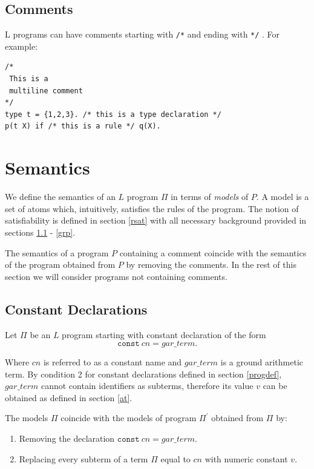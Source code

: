 \documentclass[a4paper,10pt]{article}
\begin{document}
\subsection{Comments}

L programs can have comments starting with \texttt{/*} and ending with \texttt{*/} . For example:

\begin{verbatim}
/*
 This is a
 multiline comment
*/
type t = {1,2,3}. /* this is a type declaration */
p(t X) if /* this is a rule */ q(X). 
\end{verbatim}


\section{Semantics}
We define the semantics of an $L$ program $\Pi$ in terms of \textit{models} of $P$. A model is a set of atoms which, intuitively, satisfies the rules of the program. The notion of satisfiability is defined in section \ref{rsat} with all necessary background provided in sections 
\ref{constants} - \ref{grp}.

The semantics of a program $P$ containing a comment coincide with the semantics of the program obtained from $P$ by removing the comments. In the rest of this section we will consider programs not containing comments.




\subsection{Constant Declarations} \label{constants}


Let $\Pi$ be an $L$ program starting with constant declaration of the form
$$\texttt{const} ~cn = gar\_term.$$

Where $cn$ is referred to as a constant name and $gar\_term$ is a ground arithmetic term.
By condition 2 for constant declarations defined in section \ref{progdef}, $gar\_term$ cannot contain identifiers as subterms,
therefore its value $v$ can be obtained as defined in section \ref{at}. 

The models $\Pi$ coincide with the models of program $\Pi^\prime$ obtained from $\Pi$ by:
\begin{enumerate}
\item Removing the declaration $\texttt{const}~cn = gar\_term.$
\item Replacing every subterm of a term $\Pi$ equal to $cn$ with numeric constant $v$. 
\end{enumerate} 
\end{document}
